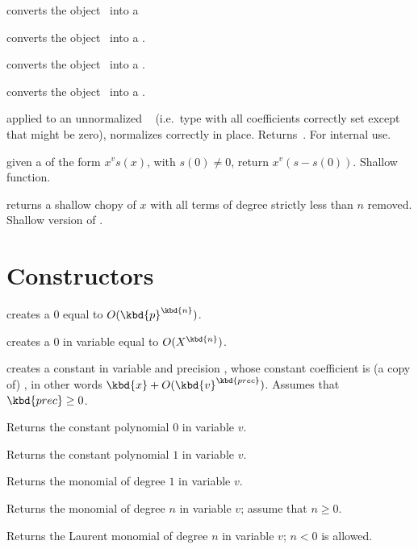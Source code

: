  converts the object~ into a 

 converts the object~ into a .

 converts the object~ into a .

 converts the object~ into a
.

 applied to an unnormalized ~
(i.e.~type  with all coefficients correctly set except that 
might be zero), normalizes  correctly in place. Returns~.
For internal use.

 given a  of the form $x^v s(x)$, with
$s(0)\neq 0$, return $x^v(s - s(0))$. Shallow function.

 returns a shallow chopy of  $x$
with all terms of degree strictly less than $n$ removed. Shallow
version of .

\section{Constructors}

\label{se:clean}

 creates a $0$  equal to
$O(\kbd{p}^\kbd{n})$.

 creates a $0$  in variable
 equal to $O(X^\kbd{n})$.

 creates a constant 
in variable  and precision , whose constant coefficient is
(a copy of) , in other words $\kbd{x} + O(\kbd{v}^\kbd{prec})$.
Assumes that $\kbd{prec}\geq 0$.

 Returns the constant polynomial $0$ in variable $v$.

 Returns the constant polynomial $1$ in variable $v$.

 Returns the monomial of degree $1$ in variable $v$.

 Returns the monomial of degree $n$
in variable $v$; assume that $n \geq 0$.

 Returns the Laurent monomial of degree $n$
in variable $v$; $n < 0$ is allowed.

